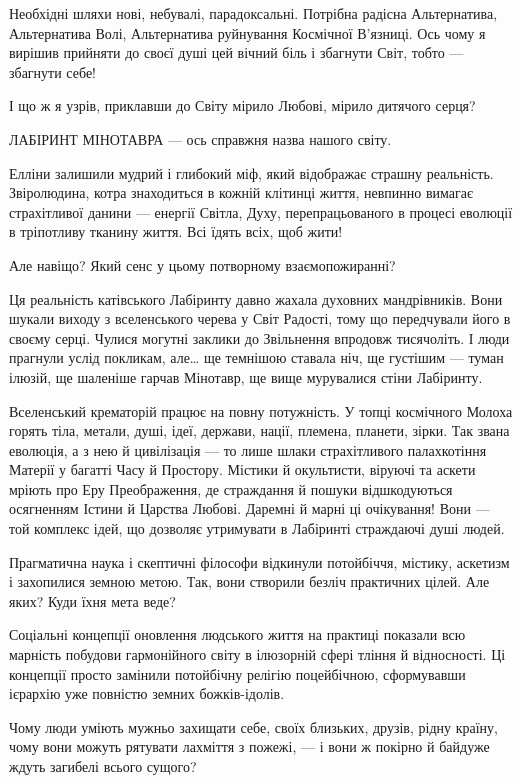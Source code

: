 Необхідні шляхи нові, небувалі, парадоксальні. Потрібна радісна Альтернатива,
Альтернатива Волі, Альтернатива руйнування Космічної В’язниці. Ось чому я
вирішив прийняти до своєї душі цей вічний біль і збагнути Світ, тобто —
збагнути себе!

І що ж я узрів, приклавши до Світу мірило Любові, мірило дитячого серця?

ЛАБІРИНТ МІНОТАВРА — ось справжня назва нашого світу.

Елліни залишили мудрий і глибокий міф, який відображає страшну реальність.
Звіролюдина, котра знаходиться в кожній клітинці життя, невпинно вимагає
страхітливої данини — енергії Світла, Духу, перепрацьованого в процесі еволюції
в тріпотливу тканину життя. Всі їдять всіх, щоб жити!

Але навіщо? Який сенс у цьому потворному взаємопожиранні?

Ця реальність катівського Лабіринту давно жахала духовних мандрівників. Вони
шукали виходу з вселенського черева у Світ Радості, тому що передчували його в
своєму серці. Чулися могутні заклики до Звільнення впродовж тисячоліть. І люди
прагнули услід покликам, але… ще темнішою ставала ніч, ще густішим — туман
ілюзій, ще шаленіше гарчав Мінотавр, ще вище мурувалися стіни Лабіринту.

Вселенський крематорій працює на повну потужність. У топці космічного Молоха
горять тіла, метали, душі, ідеї, держави, нації, племена, планети, зірки. Так
звана еволюція, а з нею й цивілізація — то лише шлаки страхітливого
палахкотіння Матерії у багатті Часу й Простору. Містики й окультисти, віруючі
та аскети мріють про Еру Преображення, де страждання й пошуки відшкодуються
осягненням Істини й Царства Любові. Даремні й марні ці очікування! Вони — той
комплекс ідей, що дозволяє утримувати в Лабіринті страждаючі душі людей.

Прагматична наука і скептичні філософи відкинули потойбіччя, містику, аскетизм
і захопилися земною метою. Так, вони створили безліч практичних цілей. Але
яких? Куди їхня мета веде?

Соціальні концепції оновлення людського життя на практиці показали всю марність
побудови гармонійного світу в ілюзорній сфері тління й відносності. Ці
концепції просто замінили потойбічну релігію поцейбічною, сформувавши ієрархію
уже повністю земних божків-ідолів.

Чому люди уміють мужньо захищати себе, своїх близьких, друзів, рідну країну,
чому вони можуть рятувати лахміття з пожежі, — і вони ж покірно й байдуже ждуть
загибелі всього сущого?

